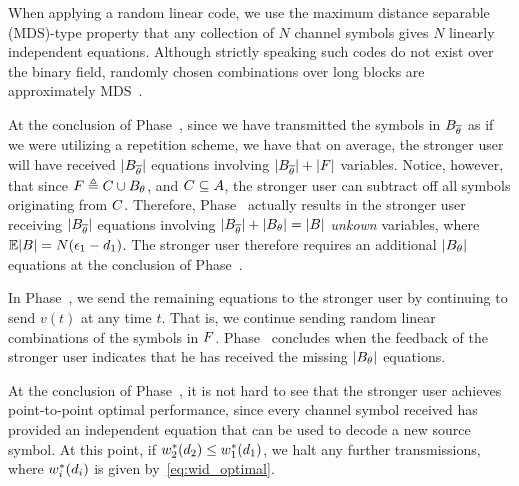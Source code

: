 \begin{remark}
	When applying a random linear code, we use the maximum distance separable (MDS)-type property that any collection of $N$ channel symbols gives $N$ linearly independent equations.  Although strictly speaking such codes do not exist over the binary field, randomly chosen combinations over long blocks are approximately MDS~\cite{TTAAJ17}.
\end{remark}

At the conclusion of Phase~, since we have transmitted the symbols in $B_{\overline{\theta}}$ as if we were utilizing a repetition scheme, we have that on average, the stronger user will have received $|B_{\overline{\theta}}|$ equations involving $|B_{\overline{\theta}}| + |F|$ variables.  Notice, however, that since $F \triangleq C \cup B_{\theta}$, and $C \subseteq A$, the stronger user can subtract off all symbols originating from $C$.  Therefore, Phase~ actually results in the stronger user receiving $|B_{\overline{\theta}}|$ equations involving $|B_{\overline{\theta}}| + |B_{\theta}| = |B|$ \emph{unkown} variables, where $\mathbb{E}|B| = N(\epsilon_1 - d_1)$.  The stronger user therefore requires an additional $|B_{\theta}|$ equations at the conclusion of Phase~.

In Phase~, we send the remaining equations to the stronger user by continuing to send $v(t)$ at any time $t$.  That is, we continue sending random linear combinations of the symbols in $F$.  Phase~ concludes when the feedback of the stronger user indicates that he has received the missing $|B_{\theta}|$ equations.

At the conclusion of Phase~, it is not hard to see that the stronger user achieves point-to-point optimal performance, since every channel symbol received has provided an independent equation that can be used to decode a new source symbol.  
At this point, if $w_{2}^{*}(d_2) \leq w_{1}^{*}(d_1)$, we halt any further transmissions, where $w_{i}^{*}(d_i)$ is given by~\eqref{eq:wid_optimal}.

